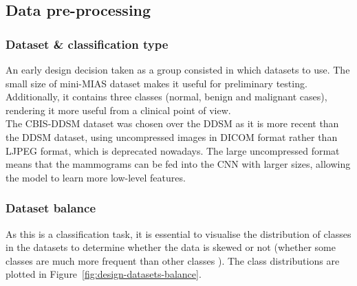 
\subsection{Data pre-processing}

\subsubsection{Dataset \& classification type}

An early design decision taken as a group consisted in which datasets to use. The small size of mini-MIAS dataset makes it useful for preliminary testing. Additionally, it contains three classes (normal, benign and malignant cases), rendering it more useful from a clinical point of view.\\  

The CBIS-DDSM dataset was chosen over the DDSM as it is more recent than the DDSM dataset, using uncompressed images in DICOM format rather than LJPEG format, which is deprecated nowadays. The large uncompressed format means that the mammograms can be fed into the CNN with larger sizes, allowing the model to learn more low-level features.

\subsubsection{Dataset balance}

As this is a classification task, it is essential to visualise the distribution of classes in the datasets to determine whether the data is skewed or not (whether some classes are much more frequent than other classes \cite{Geron2019}).  The class distributions are plotted in Figure~\ref{fig:design-datasets-balance}.

